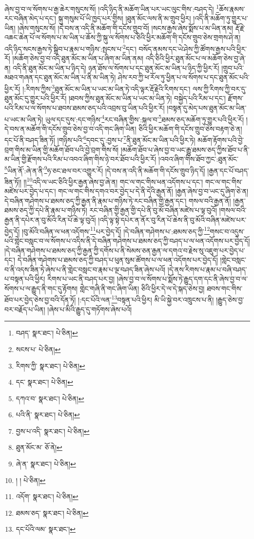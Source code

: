ཞེས་བྱ་བ་ལ་སོགས་པ་རྒྱ་ཆེར་གསུངས་སོ། །འདི་ཉིད་ནི་མཆོག་ཡིན་པར་ཡང་ལུང་གིས་:བཤད་དེ། \footnote{བཤད་  སྣར་ཐང་།  པེ་ཅིན། }ཆོས་རྣམས་རང་བཞིན་མེད་པ་དང་། སྐུ་གསུམ་པོ་ཡི་ཁྱད་པར་གྱིས། །ཐུན་མོང་ལས་ནི་མ་གྲུབ་ཕྱིར། །འདི་ནི་མཆོག་ཏུ་གྱུར་པ་ཡིན། །ཞེས་གསུངས་སོ། །དེ་བས་ན་འདི་ནི་མཆོག་གི་དངོས་གྲུབ་བོ། །སངས་རྒྱས་ཞེས་སྨོས་པ་མ་ཡིན་ནམ། རྡོ་རྗེ་འཆང་ཆེན་པོ་ལ་སོགས་པ་མ་ཡིན་པ་ཆོས་ཀྱི་སྐུ་ལ་སོགས་པ་ཅིའི་ཕྱིར་མཆོག་གི་དངོས་གྲུབ་ཅེས་གྲགས་ཤེ་ན། འདི་ཉིད་སངས་རྒྱས་ཏེ་སྒྲིབ་པ་རྣམ་པ་གཉིས་:སྤངས་པ་\footnote{སངས་པ་  པེ་ཅིན། }དང་། བསོད་ནམས་དང་ཡེ་ཤེས་ཀྱི་ཚོགས་རྒྱས་པའི་ཕྱིར་རོ། །མཆོག་ཅེས་བྱ་བ་འདི་ཐུན་མོང་མ་ཡིན་པ་ཞིག་མ་ཡིན་ནམ། འདི་ཅིའི་ཕྱིར་ཐུན་མོང་པ་ལ་མཆོག་ཅེས་བྱ་ཞེ་ན། འདི་ནི་ཐུན་མོང་མ་ཡིན་པ་ཉིད་དེ། ཉན་ཐོས་ལ་སོགས་པ་དང་ཐུན་མོང་མ་ཡིན་པ་ཉིད་ཀྱི་ཕྱིར་རོ། །གྲུབ་པའི་མཐའ་གཞན་དང་ཐུན་མོང་མ་ཡིན་པ་ནི་མ་ཡིན་ཏེ། ཤེས་རབ་ཀྱི་ཕ་རོལ་ཏུ་ཕྱིན་པ་ལ་སོགས་པ་དང་ཐུན་མོང་པའི་ཕྱིར་རོ། །:རིགས་ཀྱིས་\footnote{རིགས་ཀྱི་  སྣར་ཐང་།  པེ་ཅིན། }ཐུན་མོང་མ་ཡིན་པ་ཡང་མ་ཡིན་ཏེ་འདི་ལྟར་རྡོ་རྗེའི་རིགས་དང་། ལས་ཀྱི་རིགས་ཀྱི་བར་དུ་ཐུན་མོང་དུ་གྱུར་པའི་ཕྱིར་རོ། །ཐབས་ཀྱིས་ཐུན་མོང་མ་ཡིན་པ་ཡང་མ་ཡིན་ཏེ། བསྐྱེད་པའི་རིམ་པ་དང་། རྫོགས་པའི་རིམ་པ་ལ་སོགས་པ་ཐབས་ཐམས་ཅད་པའི་འབྲས་བུ་ཡིན་པའི་ཕྱིར་རོ། །བསྟན་དུ་མེད་པས་ཐུན་མོང་མ་ཡིན་པ་ཡང་མ་ཡིན་ཏེ། ཡུལ་དང་དུས་:དང་གཉིས་\footnote{དང་  སྣར་ཐང་།  པེ་ཅིན། }རང་བཞིན་གྱིས་:སྐལ་བ་\footnote{དཀའ་བ་  སྣར་ཐང་།  པེ་ཅིན། }ཐམས་ཅད་མཆོག་ཏུ་གྱུར་པའི་ཕྱིར་རོ། །དེ་བས་ན་མཆོག་གི་དངོས་གྲུབ་ཅེས་བྱ་བ་འདི་གང་ཞིག་ཡིན། ཅིའི་ཕྱིར་མཆོག་གི་དངོས་གྲུབ་ཅེས་བརྟག་ཅེ་ན། དང་པོ་ནི་བཤད་ཟིན་ཏོ། །གཉིས་པའི་\footnote{པའི་ནི་  སྣར་ཐང་།  པེ་ཅིན། }དབང་དུ་:བྱས་པ་\footnote{བྱས་པ་འདི་  སྣར་ཐང་།  པེ་ཅིན། }ནི་ཐུན་མོང་མ་ཡིན་པའི་ཕྱིར་ཏེ། མཆོག་རྟོགས་པའི་བྱེ་བྲག་གིས་མ་ཡིན་གྱི་མཆོག་ཐོབ་པའི་བྱེ་བྲག་གིས་སོ། །མཆོག་ཐོབ་པ་ཞེས་བྱ་བ་ཡང་རྒྱུ་ཐམས་ཅད་ཀྱིས་ཐོབ་པ་ནི་མ་ཡིན་གྱི་རྫོགས་པའི་རིམ་པ་འབའ་ཞིག་གིས་ཉེ་བར་ཐོབ་པའི་ཕྱིར་རོ། །འབའ་ཞིག་གིས་ཐོབ་ཀྱང་:ཐུན་མོང་\footnote{ཐུན་མོང་མ་  ཅོ་ནེ། }ཡིན་ནོ་:ཞེ་ན་ནི་\footnote{ཞེ་ན་  སྣར་ཐང་།  པེ་ཅིན། }ཧ་ཅང་ཐལ་བར་འགྱུར་རོ། །དེ་བས་ན་འདི་ནི་མཆོག་གི་དངོས་གྲུབ་ཉིད་དོ། །རྒྱན་དང་པོ་བཤད་ཟིན་ཏོ།། །།\footnote{། །  པེ་ཅིན། }འདི་ལ་ཡང་ཅིའི་ཕྱིར་རྒྱན་ཞེས་བྱ་ཞེ་ན། གང་ལ་གང་གིས་ཕན་འདོགས་པ་དང་། གང་ལ་གང་གིས་མཛེས་པར་བྱེད་པ་དང་། གང་ལ་གང་གིས་དགའ་བར་བྱེད་པ་དེ་ནི་དེའི་རྒྱན་ནོ། །རྒྱན་ཞེས་བྱ་བ་ཡང་དུ་ཞིག་ཅེ་ན། དེ་བཞིན་གཤེགས་པ་ཐམས་ཅད་ཀྱི་རྒྱན་ནི་རྣམ་པ་གཉིས་ཏེ་རང་བཞིན་གྱི་རྒྱན་དང་། གསལ་བའི་རྒྱན་ནོ། །རྒྱན་ཐམས་ཅད་ཀྱི་དཔེ་ནི་རྣམ་པ་གཉིས་ཏེ། རང་བཞིན་གྱི་རྒྱན་གྱི་དཔེ་ནི་བུ་མོ་བཞིན་མཛེས་པ་ལྟ་བུའོ། །གསལ་བའི་རྒྱན་ནི་དཔེར་ན་བུ་མོའི་རིན་པོ་ཆེ་ལྟ་བུའོ། །འདི་ལྟ་སྟེ་དཔེར་ན་ནོར་བུ་རིན་པོ་ཆེས་ནི་བུ་མོའི་བཞིན་མཛེས་པར་བྱེད་དོ། །བུ་མོའི་བཞིན་ལ་ཕན་འདོགས་\footnote{འདོག་  སྣར་ཐང་།  པེ་ཅིན། }པར་བྱེད་དོ། །དེ་བཞིན་གཤེགས་པ་:ཐམས་ཅད་ཀྱི་\footnote{ཐམས་ཅད་  སྣར་ཐང་།  པེ་ཅིན། }གསང་བ་འདུས་པའི་གླེང་བསླང་བ་ལ་སོགས་པ་འདིས་ནི་དེ་བཞིན་གཤེགས་པ་ཐམས་ཅད་ཀྱི་བཤད་པ་ལ་ཕན་འདོགས་པར་བྱེད་དོ། །དེ་བཞིན་གཤེགས་པ་ཐམས་ཅད་ཀྱི་རྒྱན་ཀྱི་དགོས་པ་ནི་སེམས་ཅན་རྒྱན་ལ་དགའ་བ་རྗེས་སུ་འཇུག་པར་བྱེད་པ་དང་། དེ་བཞིན་གཤེགས་པ་ཐམས་ཅད་ཀྱི་བཤད་པ་ཕུན་སུམ་ཚོགས་པ་ལ་ཕན་འདོགས་པར་བྱེད་དོ། །གླེང་བསླང་བ་ནི་འདས་ཟིན་ཏེ་ཞེས་པ་ནི་གླེང་བསླང་བ་རྣམ་པ་ལྔ་བཤད་ཟིན་ཞེས་པའོ། །དེ་ནས་རིགས་པ་རྣམ་པ་བཞི་བཤད་པ་བསྟན་པའི་ཕྱིར། རིགས་པ་ཡང་ནི་བཤད་པར་བྱ། །ཞེས་བྱ་བ་ལ་སོགས་པ་སྨོས་ཏེ་རྒྱུད་དག་དང་ནི་ཞེས་བྱ་བ་ལ་སོགས་པ་ལ་རྒྱུད་ནི་གང་དུ་རྟོགས། གླེང་གཞི་ནི་གང་ཞིག་ཡིན། ཅིའི་ཕྱིར་དེ་ལ་དེ་སྐད་ཅེས་བྱ། ཐབས་གང་གིས་ཐོབ་པར་བྱེད་ཅེས་བྱ་བའི་དོན་ཏོ། །:དང་པོའི་ལན་\footnote{དང་པོའི་ལམ་  སྣར་ཐང་། }བསྟན་པའི་ཕྱིར། མི་ཡི་སྐྱེ་བར་འཁྲུངས་པ་ནི། །རྒྱུད་ཅེས་བྱ་བར་བརྗོད་པ་ཡིན། །ཞེས་པ་མིའི་རྒྱུད་དུ་གཏོགས་ཞེས་པའོ། 